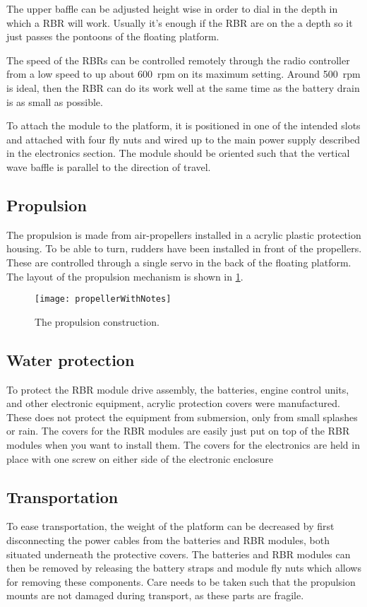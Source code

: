 The upper baffle can be adjusted height wise in order to dial in the
depth in which a RBR will work. Usually it's enough if the RBR are on the a
depth so it just passes the pontoons of the floating platform.

The speed of the RBRs can be controlled remotely through the radio controller
from a low speed to up about 600~rpm on its maximum setting. Around 500~rpm is
ideal, then the RBR can do its work well at the same time as the battery drain
is as small as possible.

To attach the module to the platform, it is positioned in one of the
intended slots and attached with four fly nuts and wired up to the main power
supply described in the electronics section. The module should be oriented such
that the vertical wave baffle is parallel to the direction of travel.

\subsection{Propulsion}
The propulsion is made from air-propellers installed in a acrylic plastic
protection housing. To be able to turn, rudders have been installed in
front of the propellers. These are controlled through a single servo in the back
of the floating platform. The layout of the propulsion mechanism is shown in
\cref{fig:propellerWithNotes}.

\begin{figure}[h]
   \centering
   \texttt{[image: propellerWithNotes]}
   \caption{The propulsion construction.}
   \label{fig:propellerWithNotes}
\end{figure}

\subsection{Water protection}
To protect the RBR module drive assembly, the batteries, engine control units,
and other electronic equipment, acrylic protection covers were manufactured.
These does not protect the equipment from submersion, only from small splashes
or rain. The covers for the RBR modules are easily just put on top of the RBR
modules when you want to install them. The covers for the electronics are held
in place with one screw on either side of the electronic enclosure

\subsection{Transportation}
To ease transportation, the weight of the platform can be decreased by first
disconnecting the power cables from the batteries and RBR modules, both situated
underneath the protective covers. The batteries and RBR modules can then be
removed by releasing the battery straps and module fly nuts which allows for
removing these components. Care needs to be taken such that the propulsion
mounts are not damaged during transport, as these parts are fragile.
